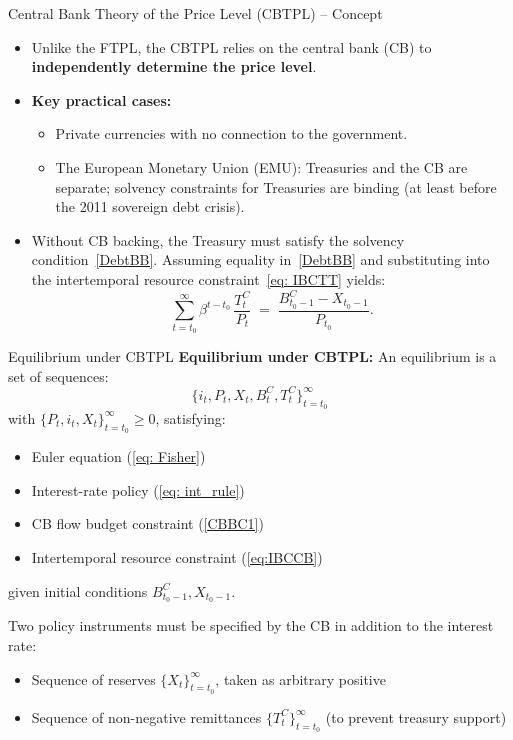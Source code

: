 \documentclass[11pt,aspectratio=169]{beamer}
\begin{document}
\begin{frame}{Central Bank Theory of the Price Level (CBTPL) – Concept}
\small
\begin{itemize}

  \item Unlike the FTPL, the CBTPL relies on the central bank (CB) to \textbf{independently determine the price level}.

  \vspace{0.25cm}
  \item \textbf{Key practical cases:}
  \begin{itemize}
    \item Private currencies with no connection to the government.
    \item The European Monetary Union (EMU): Treasuries and the CB are separate; 
    solvency constraints for Treasuries are binding (at least before the 2011 sovereign debt crisis).
  \end{itemize}

  \vspace{0.25cm}
  \item Without CB backing, the Treasury must satisfy the solvency condition~\eqref{DebtBB}.  
  Assuming equality in~\eqref{DebtBB} and substituting into the intertemporal resource constraint~\eqref{eq: IBCTT} yields:
  \begin{equation}
    \sum_{t=t_{0}}^{\infty} \beta^{t-t_{0}}\,\frac{T_t^C}{P_t}
    \;=\;
    \frac{B_{t_0-1}^C - X_{t_0-1}}{P_{t_0}}.
    \label{eq:IBCCB}
  \end{equation}

\end{itemize}
\end{frame}

\begin{frame}{Equilibrium under CBTPL}
\small
\textbf{Equilibrium under CBTPL:}  
An equilibrium is a set of sequences:
\[
\{ i_t, P_t, X_t, B_t^C, T_t^C \}_{t=t_0}^\infty
\]
with $\{P_t, i_t, X_t \}_{t=t_0}^\infty \geq 0$, satisfying:
\begin{itemize}
  \item Euler equation (\ref{eq: Fisher})
  \item Interest-rate policy (\ref{eq: int_rule})
  \item CB flow budget constraint (\ref{CBBC1})
  \item Intertemporal resource constraint (\ref{eq:IBCCB})
\end{itemize}

given initial conditions $B_{t_0-1}^C, X_{t_0-1}$.  
\break

Two policy instruments must be specified by the CB in addition to the interest rate:
\begin{itemize}
  \item Sequence of reserves $\{X_t\}_{t=t_0}^\infty$, taken as arbitrary positive
  \item Sequence of non-negative remittances $\{T_t^C\}_{t=t_0}^\infty$ (to prevent treasury support)
\end{itemize}

\end{frame}
\end{document}
